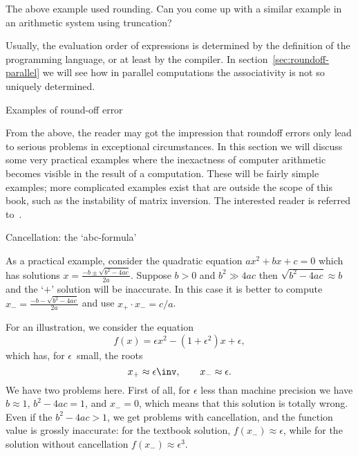 \begin{exercise}
  The above example used rounding. Can you come up with a similar example
  in an arithmetic system using truncation?
\end{exercise}


Usually, the evaluation order of expressions is determined by the definition of the
programming language, or at least by the compiler.
In section~\ref{sec:roundoff-parallel} we will see how in parallel computations the associativity
is not so uniquely determined.

 {Examples of round-off error}

From the above, the reader may got the impression that roundoff errors
only lead to serious problems in exceptional circumstances. In this
section we will discuss some very practical examples where the
inexactness of computer arithmetic becomes visible in the result of a
computation. These will be fairly simple examples; more complicated
examples exist that are outside the scope of this book, such as the
instability of matrix inversion. The interested reader is referred
to~\cite{Higham:2002:ASN,Wilkinson:roundoff}.

 {Cancellation: the `abc-formula'}
\label{sec:abc-formula}

As a practical example, consider the quadratic equation $ax^2+bx+c=0$ 
which has solutions $x=\frac{-b\pm\sqrt{b^2-4ac}}{2a}$.
Suppose $b>0$ and $b^2\gg 4ac$ then $\sqrt{b^2-4ac}\approx b$ and
the `$+$' solution will be
inaccurate. In this case it is better 
to compute $x_-=\frac{-b-\sqrt{b^2-4ac}}{2a}$ and use $x_+\cdot x_-=c/a$.

For an illustration, we consider the equation
\[ f(x) = \epsilon x^2 -(1+\epsilon^2) x + \epsilon, \]
which has, for $\epsilon$~small, the roots
\[ x_+\approx \epsilon\inv,\qquad x_-\approx \epsilon. \]
We have two problems here.
First of all, for $\epsilon$ less than machine precision
we have $b\approx 1$, $b^2-4ac=1$, and $x_-=0$,
which means that this solution is totally wrong.
Even if the  $b^2-4ac>1$,
we get problems with cancellation,
and the function value is grossly inaccurate:
for the textbook solution, $f(x_-)\approx\epsilon$,
while for the solution without cancellation $f(x_-)\approx \epsilon^3$.

